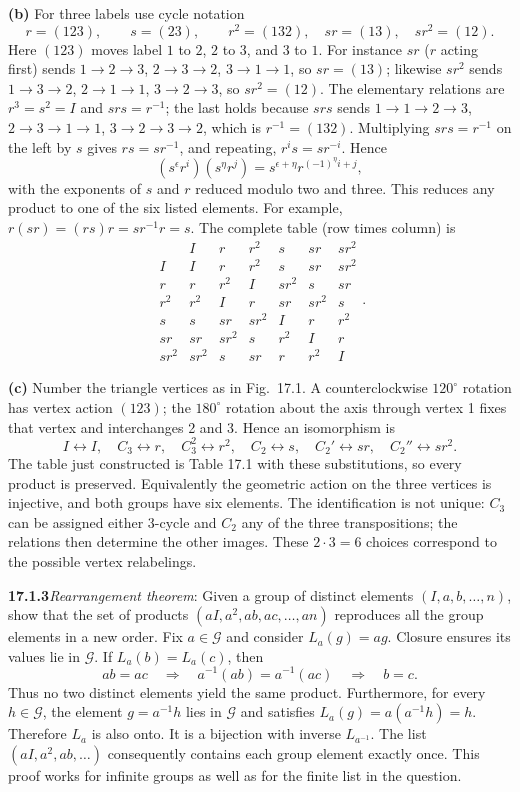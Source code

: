 \textbf{(b)} For three labels use cycle notation
\[
r=(123),\qquad s=(23),\qquad
r^2=(132),\quad sr=(13),\quad sr^2=(12).
\]
Here $(123)$ moves label $1$ to $2$, $2$ to $3$, and $3$ to $1$.
For instance $sr$ ($r$ acting first) sends $1\to2\to3$,
$2\to3\to2$, $3\to1\to1$, so $sr=(13)$; likewise $sr^2$ sends
$1\to3\to2$, $2\to1\to1$, $3\to2\to3$, so $sr^2=(12)$.
The elementary relations are
$r^3=s^2=I$ and $srs=r^{-1}$; the last holds because $srs$ sends
$1\to1\to2\to3$, $2\to3\to1\to1$, $3\to2\to3\to2$, which is
$r^{-1}=(132)$.
Multiplying $srs=r^{-1}$ on the left by $s$ gives $rs=sr^{-1}$,
and repeating, $r^is=sr^{-i}$. Hence
\[
(s^\epsilon r^i)(s^\eta r^j)=s^{\epsilon+\eta}r^{(-1)^\eta i+j},
\]
with the exponents of $s$ and $r$ reduced modulo two and three.
This reduces any product to one of the six listed elements.
For example, $r(sr)=(rs)r=sr^{-1}r=s$.
The complete table (row times column) is
\[
\begin{array}{c|rrrrrr}
 &I&r&r^2&s&sr&sr^2\\ \hline
I&I&r&r^2&s&sr&sr^2\\
r&r&r^2&I&sr^2&s&sr\\
r^2&r^2&I&r&sr&sr^2&s\\
s&s&sr&sr^2&I&r&r^2\\
sr&sr&sr^2&s&r^2&I&r\\
sr^2&sr^2&s&sr&r&r^2&I
\end{array}.
\]

\textbf{(c)} Number the triangle vertices as in Fig.~17.1.
A counterclockwise $120^\circ$ rotation has vertex action $(123)$;
the $180^\circ$ rotation about the axis through vertex 1 fixes
that vertex and interchanges 2 and 3. Hence an isomorphism is
\[
\boxed{I\leftrightarrow I,\quad C_3\leftrightarrow r,\quad
C_3^2\leftrightarrow r^2,\quad C_2\leftrightarrow s,\quad
C_2'\leftrightarrow sr,\quad C_2''\leftrightarrow sr^2}.
\]
The table just constructed is Table 17.1 with these substitutions,
so every product is preserved. Equivalently the geometric action
on the three vertices is injective, and both groups have six elements.
The identification is not unique: $C_3$ can be assigned either
3-cycle and $C_2$ any of the three transpositions; the relations
then determine the other images. These $2\cdot3=6$ choices
correspond to the possible vertex relabelings.

\par\bigskip
\noindent\textbf{17.1.3}\quad \emph{Rearrangement theorem}: Given a
group of distinct elements $(I,a,b,\ldots,n)$, show that the set of
products $(aI,a^{2},ab,ac,\ldots,an)$ reproduces all the group
elements in a new order.
\solution
Fix $a\in\mathcal G$ and consider $L_a(g)=ag$.
Closure ensures its values lie in $\mathcal G$.
If $L_a(b)=L_a(c)$, then
\[
ab=ac\quad\Longrightarrow\quad
a^{-1}(ab)=a^{-1}(ac)\quad\Longrightarrow\quad b=c.
\]
Thus no two distinct elements yield the same product.
Furthermore, for every $h\in\mathcal G$, the element
$g=a^{-1}h$ lies in $\mathcal G$ and satisfies
$L_a(g)=a(a^{-1}h)=h$. Therefore $L_a$ is also onto.
It is a bijection with inverse $L_{a^{-1}}$.
The list $(aI,a^2,ab,\ldots)$ consequently contains each group
element exactly once. This proof works for infinite groups as
well as for the finite list in the question.

